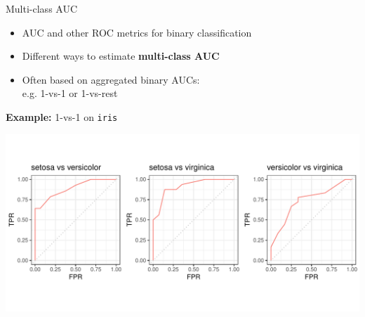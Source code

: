 \begin{vbframe}{Multi-class AUC}


\begin{itemize}
  \item AUC and other ROC metrics for binary classification
  \item Different ways to estimate \textbf{multi-class AUC}
  \item Often based on aggregated binary AUCs:\\ %
  e.g. 1-vs-1 or 1-vs-rest
\end{itemize}

\vfill



\textbf{Example:} 1-vs-1 on \texttt{iris}

\centering
\includegraphics[trim = 0 40 -20 40, clip, width=\textwidth]{figure/eval_auc_extensions}




\end{vbframe}
